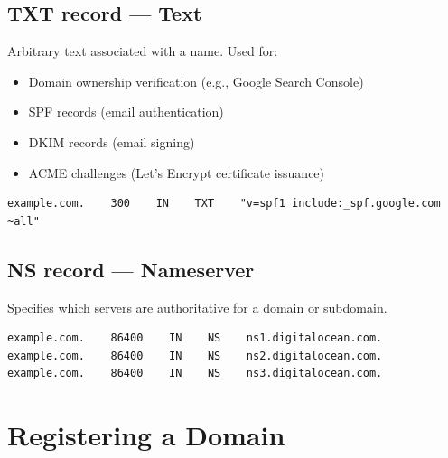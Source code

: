 \subsection*{TXT record --- Text}\label{27-domain-and-dns:txt-record--text}

Arbitrary text associated with a name. Used for:

\begin{itemize}
\tightlist
\item
  Domain ownership verification (e.g., Google Search Console)
\item
  SPF records (email authentication)
\item
  DKIM records (email signing)
\item
  ACME challenges (Let's Encrypt certificate issuance)
\end{itemize}

\begin{outputbox}[short]
\begin{Verbatim}[fontsize=\codesize, breaklines, breakanywhere, breaksymbolleft={\tiny\textcolor{muted}{$\hookrightarrow$}}]
example.com.    300    IN    TXT    "v=spf1 include:_spf.google.com ~all"
\end{Verbatim}
\end{outputbox}

\subsection*{NS record --- Nameserver}\label{27-domain-and-dns:ns-record--nameserver}

Specifies which servers are authoritative for a domain or subdomain.

\begin{outputbox}[short]
\begin{Verbatim}[fontsize=\codesize, breaklines, breakanywhere, breaksymbolleft={\tiny\textcolor{muted}{$\hookrightarrow$}}]
example.com.    86400    IN    NS    ns1.digitalocean.com.
example.com.    86400    IN    NS    ns2.digitalocean.com.
example.com.    86400    IN    NS    ns3.digitalocean.com.
\end{Verbatim}
\end{outputbox}

\setcounter{section}{2}
\section{Registering a Domain}\label{27-domain-and-dns:273-registering-a-domain}

